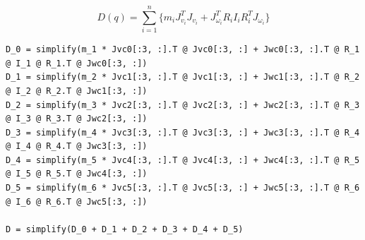 \documentclass[journal]{new-aiaa}
\begin{document}
\begin{equation}\label{eq:Dq}
    D(q) = \sum_{i=1}^{n} \{ m_i J^T_{v_i} J_{v_i} + J^T_{\omega_i} R_i I_i R^T_i J_{\omega_i}   \}
\end{equation}

\begin{verbatim}
D_0 = simplify(m_1 * Jvc0[:3, :].T @ Jvc0[:3, :] + Jwc0[:3, :].T @ R_1 @ I_1 @ R_1.T @ Jwc0[:3, :])
D_1 = simplify(m_2 * Jvc1[:3, :].T @ Jvc1[:3, :] + Jwc1[:3, :].T @ R_2 @ I_2 @ R_2.T @ Jwc1[:3, :])
D_2 = simplify(m_3 * Jvc2[:3, :].T @ Jvc2[:3, :] + Jwc2[:3, :].T @ R_3 @ I_3 @ R_3.T @ Jwc2[:3, :])
D_3 = simplify(m_4 * Jvc3[:3, :].T @ Jvc3[:3, :] + Jwc3[:3, :].T @ R_4 @ I_4 @ R_4.T @ Jwc3[:3, :])
D_4 = simplify(m_5 * Jvc4[:3, :].T @ Jvc4[:3, :] + Jwc4[:3, :].T @ R_5 @ I_5 @ R_5.T @ Jwc4[:3, :])
D_5 = simplify(m_6 * Jvc5[:3, :].T @ Jvc5[:3, :] + Jwc5[:3, :].T @ R_6 @ I_6 @ R_6.T @ Jwc5[:3, :])

D = simplify(D_0 + D_1 + D_2 + D_3 + D_4 + D_5)
\end{verbatim}
\end{document}
